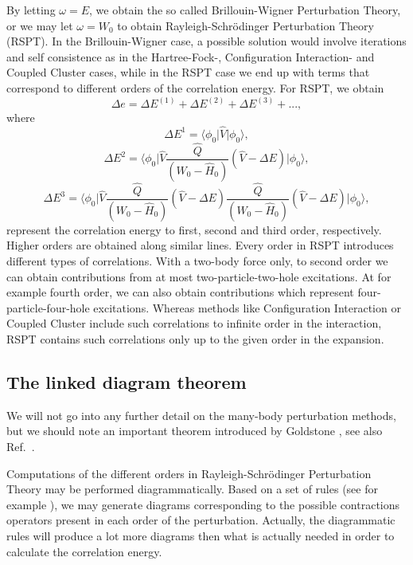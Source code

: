 By letting $\omega = E$, we obtain the so called Brillouin-Wigner
Perturbation Theory, or we may let $\omega = W_0$ to obtain
Rayleigh-Schrödinger Perturbation Theory (RSPT). In the
Brillouin-Wigner case, a possible solution would involve iterations
and self consistence as in the Hartree-Fock-, Configuration Interaction- and Coupled Cluster cases, while in the RSPT
case we end up with terms that correspond to different orders of the
correlation energy. For RSPT, we obtain
\begin{equation}
\Delta e = \Delta E^{(1)}+\Delta E^{(2)}+\Delta E^{(3)}+... ,
\end{equation}
where
\begin{equation}
\Delta E^{1} = \langle \phi_0 \vert \hat{V} \vert \phi_0 \rangle,
\end{equation}
\begin{equation}
\Delta E^{2} = \langle \phi_0 \vert \hat{V}  \frac{\hat{Q}}{(W_0 - \hat{H}_0)}  (\hat{V} - \Delta E) \vert \phi_0 \rangle,
\end{equation}
\begin{equation}
\Delta E^{3} = \langle \phi_0 \vert \hat{V} \frac{\hat{Q}}{(W_0 - \hat{H}_0)}  (\hat{V} - \Delta E) \frac{\hat{Q}}{(W_0 - \hat{H}_0)}  (\hat{V} - \Delta E)  \vert \phi_0 \rangle,
\end{equation}
represent the correlation energy to first, second and third order, respectively. Higher orders are obtained along similar lines. Every order in RSPT introduces different types of correlations. With a two-body force only, to second order we can obtain contributions from at most two-particle-two-hole excitations. At for example fourth order, we can also obtain contributions
which represent four-particle-four-hole  excitations.  
Whereas methods like Configuration Interaction or Coupled Cluster include such correlations 
to infinite order in the interaction, RSPT contains such correlations only up to the given order in the expansion.



\subsection{The linked diagram theorem}

We will not go into any further detail on the many-body perturbation
methods, but we should note an important theorem introduced by
Goldstone \cite{Goldstone1957}, see also Ref.~\cite[p.152]{ShavittBartlett2009}.

Computations of the different orders in Rayleigh-Schrödinger
Perturbation Theory may be performed diagrammatically. Based on a set
of rules (see for example \cite{ShavittBartlett2009}), we may generate
diagrams corresponding to the possible contractions operators
present in each order of the perturbation. Actually, the diagrammatic
rules will produce a lot more diagrams then what is actually needed in
order to calculate the correlation energy.

